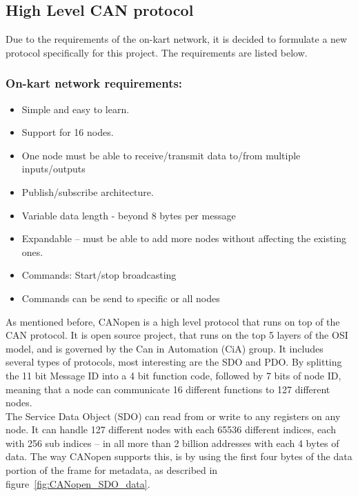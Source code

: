 
\subsection{High Level CAN protocol}\label{sub:CAN_protocol}
Due to the requirements of the on-kart network, it is decided to formulate a new protocol specifically for this project. The requirements are listed below.
\subsubsection{On-kart network requirements:}
\begin{itemize}
	\item Simple and easy to learn.
	\item Support for 16 nodes.
	\item One node must be able to receive/transmit data to/from multiple inputs/outputs
	\item Publish/subscribe architecture.
	\item Variable data length - beyond 8 bytes per message
	\item Expandable -- must be able to add more nodes without affecting the existing ones.
	\item Commands: Start/stop broadcasting 
	\item Commands can be send to specific or all nodes
\end{itemize}

\label{sub:CANopen}
As mentioned before, CANopen is a high level protocol that runs on top of the CAN protocol.
It is open source project, that runs on the top 5 layers of the OSI model\cite{CANopen_introduction}, and is governed by the Can in Automation (CiA) group.
It includes several types of protocols, most interesting are the SDO and PDO. 
By splitting the 11 bit Message ID into a 4 bit function code, followed by 7 bits of node ID, meaning that a node can communicate 16 different functions to 127 different nodes.\\
The Service Data Object (SDO) can read from or write to any registers on any node. 
It can handle 127 different nodes with each 65536 different indices, each with 256 sub indices -- in all more than 2 billion addresses with each 4 bytes of data.
The way CANopen supports this, is by using the first four bytes of the data portion of the frame for metadata, as described in figure~\ref{fig:CANopen_SDO_data}.

